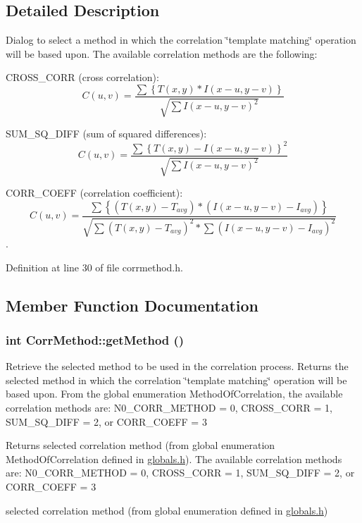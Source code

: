 \subsection{Detailed Description}
Dialog to select a method in which the correlation \char`\"{}template matching\char`\"{} operation will be based upon. The available correlation methods are the following:
\begin{DoxyItemize}
\item CROSS\_\-CORR (cross correlation): \[ C(u,v) = \frac {\sum{\left\{T(x,y) * I(x-u,y-v)\right\}}} {\sqrt{ \sum{I(x-u,y-v)^2}}} \]
\item SUM\_\-SQ\_\-DIFF (sum of squared differences): \[ C(u,v) = \frac {\sum{\left\{T(x,y)-I(x-u,y-v)\right\}^2}} {\sqrt{\sum{I(x-u,y-v)^2}}} \]
\item CORR\_\-COEFF (correlation coefficient): \[ C(u,v) = \frac {\sum{\left\{(T(x,y)-T_{avg}) * (I(x-u,y-v)-I_{avg})\right\}}} {\sqrt{\sum{(T(x,y)-T_{avg})^2} * \sum{(I(x-u,y-v)-I_{avg})^2}}} \]. 
\end{DoxyItemize}

Definition at line 30 of file corrmethod.h.

\subsection{Member Function Documentation}
\hypertarget{classCorrMethod_a3eeafdd901560c1fa92be75d4ed58872}{
\subsubsection[{getMethod}]{\setlength{\rightskip}{0pt plus 5cm}int CorrMethod::getMethod ()}}
\label{classCorrMethod_a3eeafdd901560c1fa92be75d4ed58872}


Retrieve the selected method to be used in the correlation process. Returns the selected method in which the correlation \char`\"{}template matching\char`\"{} operation will be based upon. From the global enumeration MethodOfCorrelation, the available correlation methods are: N0\_\-CORR\_\-METHOD = 0, CROSS\_\-CORR = 1, SUM\_\-SQ\_\-DIFF = 2, or CORR\_\-COEFF = 3

\begin{DoxyReturn}{Returns}
selected correlation method (from global enumeration MethodOfCorrelation defined in \hyperlink{globals_8h_source}{globals.h}). The available correlation methods are: N0\_\-CORR\_\-METHOD = 0, CROSS\_\-CORR = 1, SUM\_\-SQ\_\-DIFF = 2, or CORR\_\-COEFF = 3

selected correlation method (from global enumeration defined in \hyperlink{globals_8h_source}{globals.h}) 
\end{DoxyReturn}


